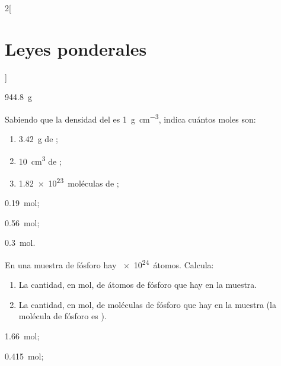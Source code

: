 \documentclass[10pt]{article}
\begin{document}
\begin{multicols}{2}[
  \section{Leyes ponderales}
  ]
  \begin{solution}
    \SI{944.8}{\gram}
  \end{solution}




  \begin{exercise}[
      tags    = {termodinámica, entalpía, entalpia de reacción, calor},
      topics  = {química, termoquímica, termodinámica},
      source  = {FQ 1B OXF 2015, p43, e34},
    ]
    Sabiendo que la densidad del  es \SI{1}{\gram\per\cubic\centi\meter}, indica cuántos moles son:
    \begin{enumerate}
      \item \SI{3.42}{\gram} de ;
      \item \SI{10}{\cubic\centi\meter} de ;
      \item \SI{1.82e23}{moléculas} de ;
    \end{enumerate}
  \end{exercise}

  \begin{solution}
    \begin{enumerate*}
      \item \SI{0.19}{\mole};
      \item \SI{0.56}{\mole};
      \item \SI{0.3}{\mole}.
    \end{enumerate*}
  \end{solution}




  \begin{exercise}[
      tags    = {termodinámica, entalpía, entalpia de reacción, calor},
      topics  = {química, termoquímica, termodinámica},
      source  = {FQ 1B OXF 2015, p43, e37},
    ]
    En una muestra de fósforo hay \SI{e24}{átomos}. Calcula:
    \begin{enumerate}
      \item La cantidad, en mol, de átomos de fósforo que hay en la muestra.
      \item La cantidad, en mol, de moléculas de fósforo que hay en la muestra (la molécula de fósforo es ).
    \end{enumerate}
  \end{exercise}

  \begin{solution}
    \begin{enumerate*}
      \item \SI{1.66}{\mole};
      \item \SI{0.415}{\mole};
    \end{enumerate*}
  \end{solution}
\end{multicols}
\end{document}
